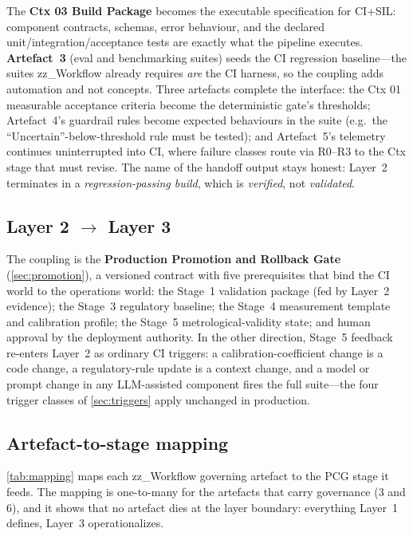 \documentclass[11pt,a4paper]{article}
\newcommand{\verified}{\emph{verified}}
\newcommand{\validated}{\emph{validated}}
\begin{document}
The \textbf{Ctx 03 Build Package} becomes the executable specification for CI+SIL: component
contracts, schemas, error behaviour, and the declared unit/integration/acceptance tests are
exactly what the pipeline executes. \textbf{Artefact~3} (eval and benchmarking suites) seeds the
CI regression baseline---the suites zz\_Workflow already requires \emph{are} the CI harness, so
the coupling adds automation and not concepts. Three artefacts complete the interface: the Ctx 01
measurable acceptance criteria become the deterministic gate's thresholds; Artefact~4's guardrail
rules become expected behaviours in the suite (e.g.\ the ``Uncertain''-below-threshold rule must
be tested); and Artefact~5's telemetry continues uninterrupted into CI, where failure classes
route via R0--R3 to the Ctx stage that must revise. The name of the handoff output stays honest:
Layer~2 terminates in a \emph{regression-passing build}, which is \verified, not \validated.

\subsection{Layer 2 $\rightarrow$ Layer 3}
\label{sec:l2-l3}

The coupling is the \textbf{Production Promotion and Rollback Gate} (\cref{sec:promotion}), a
versioned contract with five prerequisites that bind the CI world to the operations world: the
Stage~1 validation package (fed by Layer~2 evidence); the Stage~3 regulatory baseline; the Stage~4
measurement template and calibration profile; the Stage~5 metrological-validity state; and human
approval by the deployment authority. In the other direction, Stage~5 feedback re-enters Layer~2
as ordinary CI triggers: a calibration-coefficient change is a code change, a regulatory-rule
update is a context change, and a model or prompt change in any LLM-assisted component fires the
full suite---the four trigger classes of \cref{sec:triggers} apply unchanged in production.

\subsection{Artefact-to-stage mapping}
\label{sec:mapping}

\cref{tab:mapping} maps each zz\_Workflow governing artefact to the PCG stage it feeds. The
mapping is one-to-many for the artefacts that carry governance (3 and 6), and it shows that no
artefact dies at the layer boundary: everything Layer~1 defines, Layer~3 operationalizes.
\end{document}

